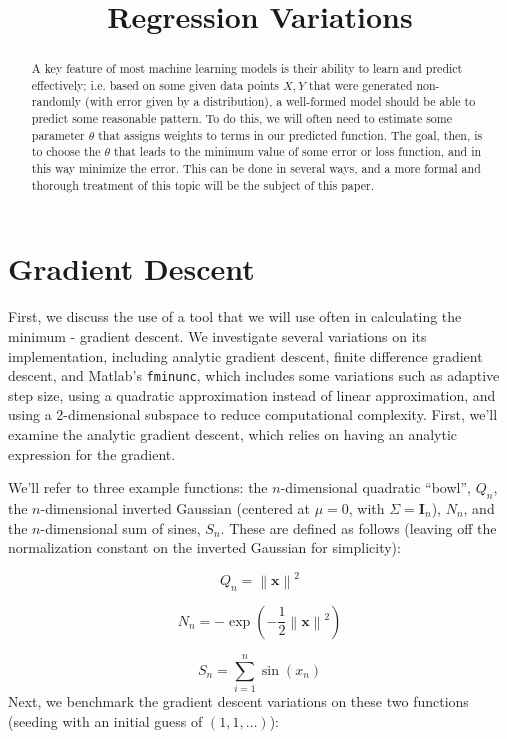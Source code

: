 \documentclass[10pt,letterpaper]{article}
\title{\vspace{-4ex}Regression Variations\vspace{-3.5ex}}
\begin{document}
\maketitle
\vspace{-0.5em}
\begin{abstract}
A key feature of most machine learning models is their ability to learn and predict effectively; i.e. based on some given data points $X, Y$ that were generated non-randomly (with error given by a distribution), a well-formed model should be able to predict some reasonable pattern. To do this, we will often need to estimate some parameter $\theta$ that assigns weights to terms in our predicted function. The goal, then, is to choose the $\theta$ that leads to the minimum value of some error or loss function, and in this way minimize the error. This can be done in several ways, and a more formal and thorough treatment of this topic will be the subject of this paper.\\
\end{abstract}

\section{Gradient Descent}
First, we discuss the use of a tool that we will use often in calculating the minimum - gradient descent. We investigate several variations on its implementation, including analytic gradient descent, finite difference gradient descent, and Matlab's \texttt{fminunc}, which includes some variations such as adaptive step size, using a quadratic approximation instead of linear approximation, and using a 2-dimensional subspace to reduce computational complexity. First, we'll examine the analytic gradient descent, which relies on having an analytic expression for the gradient.

We'll refer to three example functions: the $n$-dimensional quadratic ``bowl'', $Q_n$, the $n$-dimensional inverted Gaussian (centered at $\mu = 0$, with $\Sigma = \mathbf I_n$), $N_n$, and the $n$-dimensional sum of sines, $S_n$. These are defined as follows (leaving off the normalization constant on the inverted Gaussian for simplicity):

\[ Q_n = \left\| \mathbf x \right\| ^2 \]

\[ N_n = -\exp{\left(-\dfrac{1}{2} \left\| \mathbf x \right\| ^2 \right)} \]

\[ S_n = \sum_{i=1}^n \sin(x_n) \]
Next, we benchmark the gradient descent variations on these two functions (seeding with an initial guess of $(1,1,\ldots)$):
\end{document}
